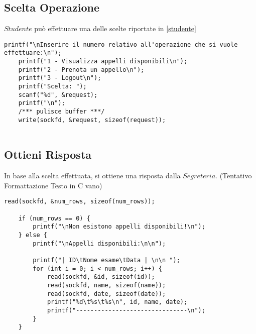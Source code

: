 \subsection{Scelta Operazione}
$Studente$ può effettuare una delle scelte riportate in \ref{studente}
\begin{lstlisting}[caption=Codice Scelta Operazione, label=lst:cso]
	printf("\nInserire il numero relativo all'operazione che si vuole effettuare:\n");
	printf("1 - Visualizza appelli disponibili\n");
	printf("2 - Prenota un appello\n");
	printf("3 - Logout\n");
	printf("Scelta: ");
	scanf("%d", &request);
	printf("\n");
	/*** pulisce buffer ***/
	write(sockfd, &request, sizeof(request));
	
\end{lstlisting}
\newpage
\subsection{Ottieni Risposta}
In base alla scelta effettuata, si ottiene una risposta dalla $Segreteria$. (Tentativo Formattazione Testo in C vano)
\begin{lstlisting}[caption=Codice Ottieni Risposta (Richiesta Appelli), label=lst:cor]
	read(sockfd, &num_rows, sizeof(num_rows));
	
	if (num_rows == 0) {
		printf("\nNon esistono appelli disponibili!\n");
	} else {
		printf("\nAppelli disponibili:\n\n");
		
		printf("| ID\tNome esame\tData | \n\n ");
		for (int i = 0; i < num_rows; i++) {
			read(sockfd, &id, sizeof(id));
			read(sockfd, name, sizeof(name));
			read(sockfd, date, sizeof(date));
			printf("%d\t%s\t%s\n", id, name, date);
			printf("-------------------------------\n");
		}
	}	
\end{lstlisting}


